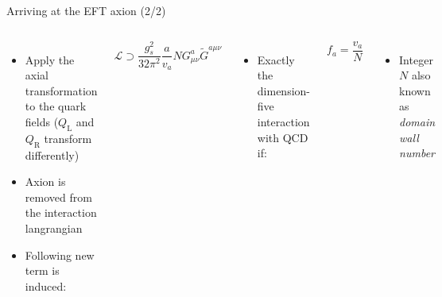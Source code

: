 \documentclass[aspectratio=1610, 9pt]{beamer}
\begin{document}
\begin{frame}{Arriving at the EFT axion (2/2)}
  \begin{columns}
    \column{\textwidth}
    \begin{itemize}
      \item Apply the axial transformation to the quark fields ($Q_{\mathrm{L}}$ and $Q_{\mathrm{R}}$ transform differently)
      \item Axion is removed from the interaction langrangian
      \item Following new term is induced:
    \end{itemize}
    \begin{equation*}
      \mathcal{L} \supset \frac{g_s^2}{32\pi^2} \frac{a}{v_a} N G^a_{\mu\nu} \tilde{G}^{a\mu\nu}
    \end{equation*}
    \begin{itemize}
      \item Exactly the dimension-five interaction with QCD if:
    \end{itemize}
    \begin{equation*}
      f_a = \frac{v_a}{N}
    \end{equation*}
    \begin{itemize}
      \item Integer $N$ also known as \textit{domain wall number}
    \end{itemize}
  \end{columns} 
\end{frame}
\end{document}
